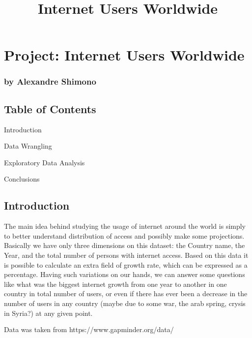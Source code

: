 \documentclass[11pt]{article}
\title{Internet Users Worldwide}
\begin{document}
    
    
    \maketitle
    
    

    
    \section{Project: Internet Users
Worldwide}\label{project-internet-users-worldwide}

\subsubsection{by Alexandre Shimono}\label{by-alexandre-shimono}

\subsection{Table of Contents}\label{table-of-contents}

Introduction

Data Wrangling

Exploratory Data Analysis

Conclusions

    \subsection{Introduction}\label{introduction}

The main idea behind studying the usage of internet around the world is
simply to better understand distribution of access and possibly make
some projections. Basically we have only three dimensions on this
dataset: the Country name, the Year, and the total number of persons
with internet access. Based on this data it is possible to calculate an
extra field of growth rate, which can be expressed as a percentage.
Having such variations on our hands, we can answer some questions like
what was the biggest internet growth from one year to another in one
country in total number of users, or even if there has ever been a
decrease in the number of users in any country (maybe due to some war,
the arab spring, crysis in Syria?) at any given point.

Data was taken from https://www.gapminder.org/data/
\end{document}
